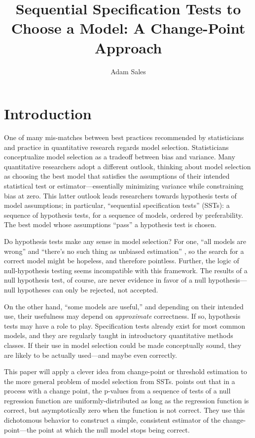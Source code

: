 \documentclass[12pt]{article}\usepackage[]{graphicx}\usepackage[]{color}
\title{Sequential Specification Tests to Choose a Model: A
  Change-Point Approach}
\author{Adam Sales}
\begin{document}
\maketitle

\section{Introduction}

One of many mis-matches between best practices recommended by
statisticians and practice in quantitative research regards model
selection.
Statisticians conceptualize model selection as a tradeoff between bias
and variance.
Many quantitative researchers adopt a different outlook, thinking about model selection as choosing
the best model that satisfies the assumptions of their intended
statistical test or estimator---essentially minimizing variance while
constraining bias at zero.
This latter outlook leads researchers towards hypothesis tests of
model assumptions; in particular, ``sequential specification tests'' (SSTs): a sequence of hypothesis tests, for
a sequence of models, ordered by preferability.
The best model whose assumptions ``pass'' a hypothesis test is chosen.

Do hypothesis tests make any sense in model selection?
For one, ``all models are wrong''
\citep[p. 2]{modelsWrong} and ``there's no such thing as unbiased
estimation'' \citep{gelmanBlogUnbiased}, so the search for a correct
model might be hopeless, and therefore pointless.
Further, the logic of null-hypothesis testing seems incompatible
with this framework.
The results of a null hypothesis test, of course, are never evidence
in favor of a null hypothesis---null hypotheses can only be rejected,
not accepted.

On the other hand, ``some models are useful,'' and depending on their
intended use, their usefulness may depend on \emph{approximate}
correctness.
If so, hypothesis tests may have a role to play.
Specification tests already exist for most common models, and
they are regularly taught in introductory quantitative methods
classes.
If their use in model selection could be made conceptually sound, they
are likely to be actually used---and maybe even correctly.

This paper will apply a clever idea from change-point or threshold
estimation to the more general problem of model selection from SSTs.
\citet{mallik} points out that in a process with a change point,
the p-values from a sequence of tests of a null regression function
are uniformly-distributed as long as the regression function is
correct, but asymptotically zero when the function is not correct.
They use this dichotomous behavior to construct a simple, consistent
estimator of the change-point---the point at which the null model
stops being correct.
\end{document}
